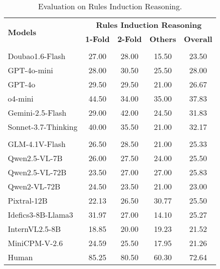 \documentclass{article}
\begin{document}
\begin{table}[b]
\centering
\begin{tabular}{l|cccc}
\toprule
\multirow{2}{*}{\textbf{Models}} & \multicolumn{4}{c}{\textbf{Rules Induction Reasoning}} \\
 & \textbf{1-Fold} & \textbf{2-Fold} & \textbf{Others} & \textbf{Overall} \\
\midrule
\rowcolor{yellow!20}\multicolumn{5}{l}{\textbf{\textit{Proprietary}}} \\
Doubao1.6-Flash &27.00 &28.00 &15.50 &23.50 \\
GPT-4o-mini &28.00 &30.50&25.50 &28.00 \\
GPT-4o & 29.50&29.50 & 21.00&26.67 \\
o4-mini & \cellcolor{gray!30}44.50&34.00 & \cellcolor{gray!30}35.00&\cellcolor{gray!30}37.83 \\
Gemini-2.5-Flash &29.00 &\cellcolor{gray!30}42.00 &24.50 &31.83 \\
Sonnet-3.7-Thinking &40.00 &35.50 & 21.00& 32.17\\
\midrule
\rowcolor{yellow!20}\multicolumn{5}{l}{\textbf{\textit{Open-source}}} \\
GLM-4.1V-Flash & 26.50& 28.50& 21.00&25.33 \\
Qwen2.5-VL-7B &26.00 &27.50 &24.00 & 25.50\\
Qwen2.5-VL-72B &23.50 &27.00 &27.00 & 25.83\\
Qwen2-VL-72B &24.50 &23.50 &21.00 &23.00 \\
Pixtral-12B &22.13 & 26.50& 30.77& 25.50\\
Idefics3-8B-Llama3 &31.97 &27.00 & 14.10&25.27 \\
InternVL2.5-8B & 18.85& 20.00&19.23 & 21.52\\
MiniCPM-V-2.6 & 24.59& 25.50& 17.95& 21.26\\
\midrule
Human&85.25&80.50&60.30&72.64\\
\bottomrule
\end{tabular}
\caption{Evaluation on Rules Induction Reasoning.}
\label{tab:rules induction}
\end{table}
\end{document}
